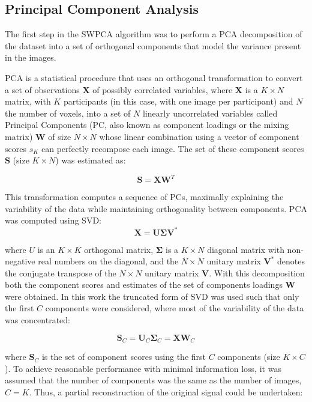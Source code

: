 \subsection{Principal Component Analysis}\label{sec:pca}
The first step in the \ac{SWPCA} algorithm was to perform a \ac{PCA} decomposition
of the dataset into a set of orthogonal components that model the
variance present in the images. 

\ac{PCA} is a statistical procedure that uses an orthogonal transformation to convert a set of observations $\mathbf{X}$ of possibly correlated variables, where $\mathbf{X}$ is a $K\times N$ matrix, with $K$ participants (in this case, with one image per participant) and $N$ the number of voxels, into a set of $N$ linearly uncorrelated variables called Principal Components (PC, also known as component loadings or the mixing matrix)  $\mathbf{W}$ of size $N\times N$ whose linear combination using a vector of component scores  ${s}_{K}$ can perfectly recompose each image. The set of these component scores  $\mathbf{S}$ (size $K \times N$) was estimated as:

\begin{equation}
	\mathbf{S}=\mathbf{X}\mathbf{W}^T
\end{equation}

This transformation computes a sequence of PCs, maximally explaining the
variability of the data while maintaining orthogonality between
components. \ac{PCA} was computed using \acf{SVD}:
\begin{equation}
	\mathbf{X} = \mathbf{U}\boldsymbol{\Sigma}\mathbf{V}^*
\end{equation}

where  $U$ is an $K\times K$ orthogonal matrix,  $\boldsymbol\Sigma$ is a $K\times N$ diagonal matrix with non-negative real numbers on the diagonal, and the $N\times N$ unitary matrix  $\mathbf{V}^*$ denotes the conjugate transpose of the $N\times N$ unitary matrix  $\mathbf{V}$. With this decomposition both the component scores and estimates of the set of components loadings  $\mathbf{W}$ were obtained. In this work the truncated form of \ac{SVD} was used such that only the first $C$ components were considered, where most of the variability of the data was concentrated:

\begin{equation}
	\mathbf{S}_C = \mathbf{U}_C \boldsymbol{\Sigma}_C = \mathbf{X}\mathbf{W}_C
\end{equation}

where  $\mathbf{S}_C$ is the set of component scores using the first $C$ components (size $K\times C$). To achieve reasonable performance with minimal information loss, it was assumed that the number of components was the same as the number of images, $C=K$. Thus, a partial reconstruction of the original signal could be undertaken:

